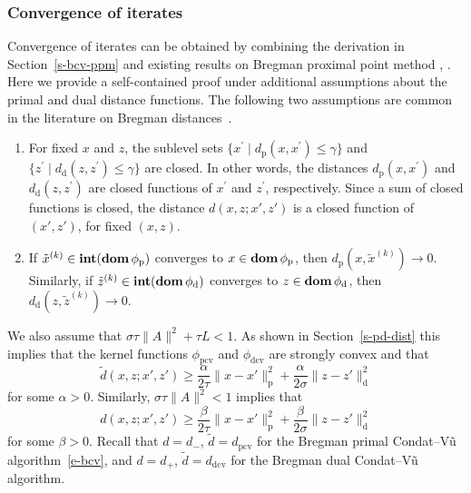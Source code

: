 \documentclass[letterpaper,11pt]{article}
\newcommand{\BEQ}{\begin{equation}}
\newcommand{\EEQ}{\end{equation}}
\newcommand{\dom}{\mathop{\bf dom}}
\newcommand{\intr}{\mathop{\bf int}}
\newcommand{\primal}{\mathrm p}
\newcommand{\dual}{\mathrm d}
\begin{document}
\subsubsection{Convergence of iterates}

Convergence of iterates can be obtained by combining the derivation
in Section~\ref{s-bcv-ppm} and existing results on Bregman proximal point
method \cite[Theorem~3.1]{Gul:94}, \cite[Theorem~3.2]{SS00}.
Here we provide a self-contained proof under additional assumptions 
about the primal and dual distance functions.
The following two assumptions are common in the literature
on Bregman distances~\cite{ChT:93,Eck:93,Gul:94,CeZ:97}.
\begin{enumerate}
\item For fixed $x$ and $z$, the sublevel sets
$\{x^\prime \mid d_\primal(x,x^\prime) \leq \gamma\}$ and
$\{z^\prime \mid d_\dual(z,z^\prime) \leq \gamma\}$
are closed.
In other words, the distances $d_\primal(x,x^\prime)$ 
and $d_\dual(z,z^\prime)$ are closed functions of 
$x^\prime$ and $z^\prime$, respectively.
Since a sum of closed functions is closed, the distance
$d(x,z; x',z')$ is a closed function of $(x',z')$, for fixed $(x,z)$.

\item If $\tilde x^{(k)} \in \intr(\dom \phi_\primal)$ converges to
$x \in \dom \phi_\primal$, then $d_\primal(x,\tilde x^{(k)}) \to 0$.
Similarly, if $\tilde z^{(k)} \in \intr(\dom \phi_\dual)$ converges to
$z \in \dom \phi_\dual$, then $d_\dual(z,\tilde z^{(k)}) \to 0$.
\end{enumerate}
We also assume that 
$\sigma\tau \|A\|^2 + \tau L < 1$.
As shown in Section~\ref{s-pd-dist} this implies that
the kernel functions $\phi_\mathrm{pcv}$ and $\phi_\mathrm{dcv}$ are
strongly convex and that
\BEQ \label{e-bcv-str-cvx-1}
 \tilde d(x,z; x',z') \geq 
 \frac{\alpha}{2\tau} \|x-x'\|_\primal^2
 + \frac{\alpha}{2\sigma} \|z-z'\|_\dual^2
\EEQ
for some $\alpha > 0$.  Similarly, $\sigma\tau\|A\|^2 < 1$ implies 
that
\BEQ \label{e-bcv-str-cvx-2}
 d(x,z; x',z') \geq 
 \frac{\beta}{2\tau} \|x-x'\|_\primal^2
 + \frac{\beta}{2\sigma} \|z-z'\|_\dual^2
\EEQ
for some $\beta > 0$.
Recall that $d=d_-$, $\tilde d=d_\mathrm{pcv}$
for the Bregman primal Condat--V\~u algorithm~\eqref{e-bcv},
and $d=d_+$, $\tilde d=d_\mathrm{dcv}$ 
for the Bregman dual Condat--V\~u
algorithm.
\end{document}
